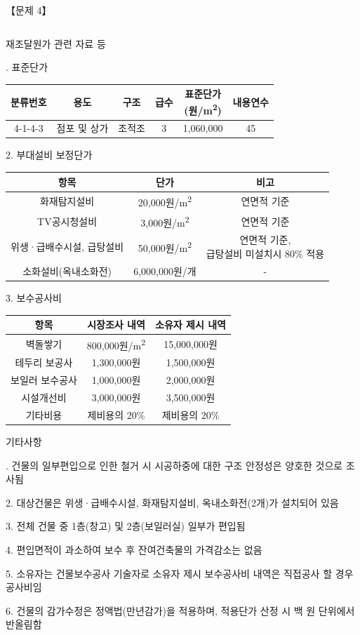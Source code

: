 \begin{longquestion}{【문제 4】}
{\begin{tabular}{|c|c|c|c|c|c|}
\end{tabular}\par}
\medskip{} 재조달원가 관련 자료 등 \par
\medskip{}. 표준단가 \par
{\small\centering
\begin{tabular}{|c|c|c|c|c|c|}\hline
분류번호 & 용도 & 구조 & 급수 & \makecell{표준단가\\(원/m\textsuperscript{2})} & 내용연수 \\\hline
4-1-4-3 & 점포 및 상가 & 조적조 & 3 & 1,060,000 & 45 \\\hline
\end{tabular}\par}
2. 부대설비 보정단가 \par
{\small\centering
\begin{tabular}{|c|c|c|}\hline
항목 & 단가 & 비고 \\\hline
화재탐지설비 & 20,000원/m\textsuperscript{2} & 연면적 기준 \\\hline
TV공시청설비 & 3,000원/m\textsuperscript{2} & 연면적 기준 \\\hline
위생·급배수시설, 급탕설비 & 50,000원/m\textsuperscript{2} & \makecell{연면적 기준,\\급탕설비 미설치시 80\% 적용} \\\hline
소화설비(옥내소화전) & 6,000,000원/개 & - \\\hline
\end{tabular}\par}
3. 보수공사비 \par
{\small\centering
\begin{tabular}{|c|c|c|}\hline
항목 & 시장조사 내역 & 소유자 제시 내역 \\\hline
벽돌쌓기 & 800,000원/m\textsuperscript{2} & 15,000,000원 \\\hline
테두리 보공사 & 1,300,000원 & 1,500,000원 \\\hline
보일러 보수공사 & 1,000,000원 & 2,000,000원 \\\hline
시설개선비 & 3,000,000원 & 3,500,000원 \\\hline
기타비용 & 제비용의 20\% & 제비용의 20\% \\\hline
\end{tabular}\par}
\medskip{} 기타사항 \par
\medskip{}. 건물의 일부편입으로 인한 철거 시 시공하중에 대한 구조 안정성은 양호한 것으로 조사됨 \par
2. 대상건물은 위생·급배수시설, 화재탐지설비, 옥내소화전(2개)가 설치되어 있음 \par
3. 전체 건물 중 1층(창고) 및 2층(보일러실) 일부가 편입됨 \par
4. 편입면적이 과소하여 보수 후 잔여건축물의 가격감소는 없음 \par
5. 소유자는 건물보수공사 기술자로 소유자 제시 보수공사비 내역은 직접공사 할 경우 공사비임 \par
6. 건물의 감가수정은 정액법(만년감가)을 적용하며, 적용단가 산정 시 백 원 단위에서 반올림함 \par
\end{longquestion}
